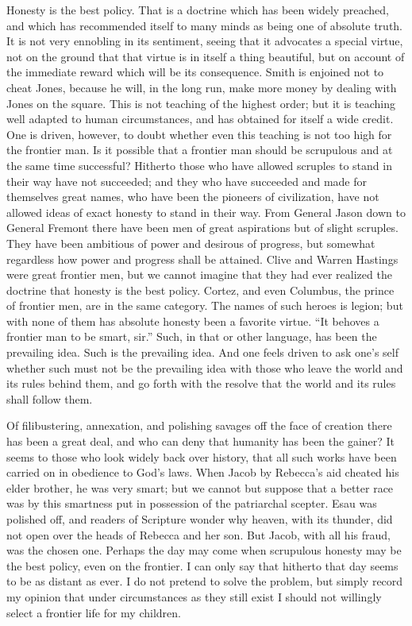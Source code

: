 Honesty is the best policy.  That is a doctrine which has been
widely preached, and which has recommended itself to many minds as
being one of absolute truth.  It is not very ennobling in its
sentiment, seeing that it advocates a special virtue, not on the
ground that that virtue is in itself a thing beautiful, but on
account of the immediate reward which will be its consequence.
Smith is enjoined not to cheat Jones, because he will, in the long
run, make more money by dealing with Jones on the square.  This is
not teaching of the highest order; but it is teaching well adapted
to human circumstances, and has obtained for itself a wide credit.
One is driven, however, to doubt whether even this teaching is not
too high for the frontier man.  Is it possible that a frontier man
should be scrupulous and at the same time successful?  Hitherto
those who have allowed scruples to stand in their way have not
succeeded; and they who have succeeded and made for themselves
great names, who have been the pioneers of civilization, have not
allowed ideas of exact honesty to stand in their way.  From General
Jason down to General Fremont there have been men of great
aspirations but of slight scruples.  They have been ambitious of
power and desirous of progress, but somewhat regardless how power
and progress shall be attained.  Clive and Warren Hastings were
great frontier men, but we cannot imagine that they had ever
realized the doctrine that honesty is the best policy.  Cortez, and
even Columbus, the prince of frontier men, are in the same
category.  The names of such heroes is legion; but with none of
them has absolute honesty been a favorite virtue.  ``It behoves a
frontier man to be smart, sir.''  Such, in that or other language,
has been the prevailing idea.  Such is the prevailing idea.  And
one feels driven to ask one's self whether such must not be the
prevailing idea with those who leave the world and its rules behind
them, and go forth with the resolve that the world and its rules
shall follow them.

Of filibustering, annexation, and polishing savages off the face of
creation there has been a great deal, and who can deny that
humanity has been the gainer?  It seems to those who look widely
back over history, that all such works have been carried on in
obedience to God's laws.  When Jacob by Rebecca's aid cheated his
elder brother, he was very smart; but we cannot but suppose that a
better race was by this smartness put in possession of the
patriarchal scepter.  Esau was polished off, and readers of
Scripture wonder why heaven, with its thunder, did not open over
the heads of Rebecca and her son.  But Jacob, with all his fraud,
was the chosen one.  Perhaps the day may come when scrupulous
honesty may be the best policy, even on the frontier.  I can only
say that hitherto that day seems to be as distant as ever.  I do
not pretend to solve the problem, but simply record my opinion that
under circumstances as they still exist I should not willingly
select a frontier life for my children.

